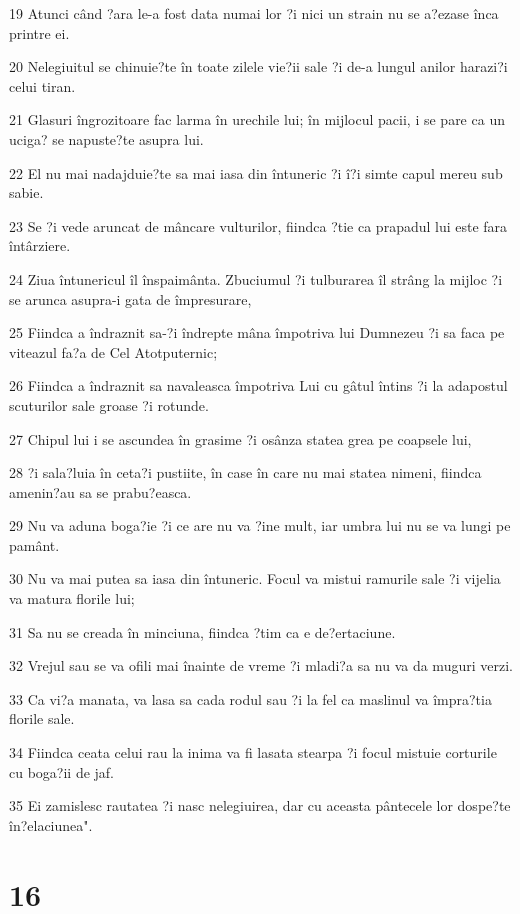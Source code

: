 \par 19 Atunci când ?ara le-a fost data numai lor ?i nici un strain nu se a?ezase înca printre ei.
\par 20 Nelegiuitul se chinuie?te în toate zilele vie?ii sale ?i de-a lungul anilor harazi?i celui tiran.
\par 21 Glasuri îngrozitoare fac larma în urechile lui; în mijlocul pacii, i se pare ca un uciga? se napuste?te asupra lui.
\par 22 El nu mai nadajduie?te sa mai iasa din întuneric ?i î?i simte capul mereu sub sabie.
\par 23 Se ?i vede aruncat de mâncare vulturilor, fiindca ?tie ca prapadul lui este fara întârziere.
\par 24 Ziua întunericul îl înspaimânta. Zbuciumul ?i tulburarea îl strâng la mijloc ?i se arunca asupra-i gata de împresurare,
\par 25 Fiindca a îndraznit sa-?i îndrepte mâna împotriva lui Dumnezeu ?i sa faca pe viteazul fa?a de Cel Atotputernic;
\par 26 Fiindca a îndraznit sa navaleasca împotriva Lui cu gâtul întins ?i la adapostul scuturilor sale groase ?i rotunde.
\par 27 Chipul lui i se ascundea în grasime ?i osânza statea grea pe coapsele lui,
\par 28 ?i sala?luia în ceta?i pustiite, în case în care nu mai statea nimeni, fiindca amenin?au sa se prabu?easca.
\par 29 Nu va aduna boga?ie ?i ce are nu va ?ine mult, iar umbra lui nu se va lungi pe pamânt.
\par 30 Nu va mai putea sa iasa din întuneric. Focul va mistui ramurile sale ?i vijelia va matura florile lui;
\par 31 Sa nu se creada în minciuna, fiindca ?tim ca e de?ertaciune.
\par 32 Vrejul sau se va ofili mai înainte de vreme ?i mladi?a sa nu va da muguri verzi.
\par 33 Ca vi?a manata, va lasa sa cada rodul sau ?i la fel ca maslinul va împra?tia florile sale.
\par 34 Fiindca ceata celui rau la inima va fi lasata stearpa ?i focul mistuie corturile cu boga?ii de jaf.
\par 35 Ei zamislesc rautatea ?i nasc nelegiuirea, dar cu aceasta pântecele lor dospe?te în?elaciunea".

\chapter{16}

